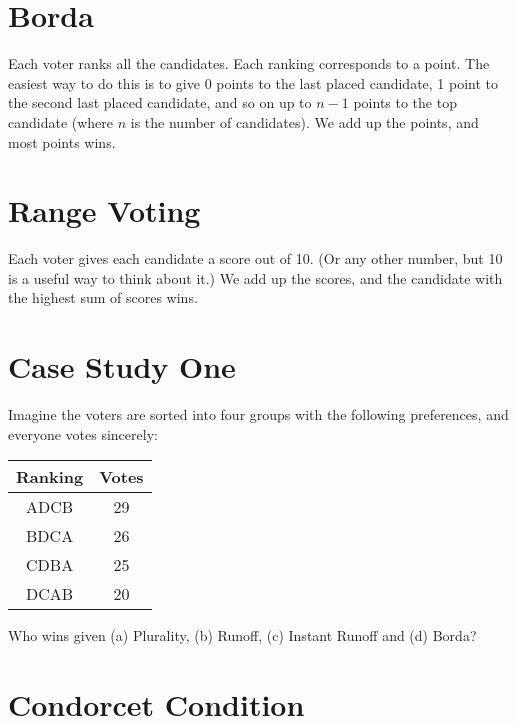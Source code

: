 \section{Borda}
\label{borda}

Each voter ranks all the candidates. Each ranking corresponds to a point. The easiest way to do this is to give 0 points to the last placed candidate, 1 point to the second last placed candidate, and so on up to $n-1$ points to the top candidate (where $n$ is the number of candidates). We add up the points, and most points wins.

\section{Range Voting}
\label{rangevoting}

Each voter gives each candidate a score out of 10. (Or any other number, but 10 is a useful way to think about it.) We add up the scores, and the candidate with the highest sum of scores wins.

\newpage

\section{Case Study One}
\label{casestudyone}

Imagine the voters are sorted into four groups with the following preferences, and everyone votes sincerely:

\begin{table}[htbp]
\begin{minipage}{\linewidth}
\setlength{\tymax}{0.5\linewidth}
\centering
\small
\begin{tabulary}{\textwidth}{@{}cc@{}} \toprule
 Ranking & Votes \\
\midrule

 ADCB & 29 \\
 BDCA & 26 \\
 CDBA & 25 \\
 DCAB & 20 \\
\bottomrule

\end{tabulary}
\end{minipage}
\end{table}
\noindent Who wins given (a) Plurality, (b) Runoff, (c) Instant Runoff and (d) Borda?

\section{Condorcet Condition}
\label{condorcetcondition}

